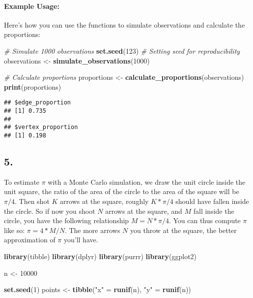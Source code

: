 \documentclass[
]{article}
\newenvironment{Shaded}{\begin{snugshade}}{\end{snugshade}}
\newcommand{\CommentTok}[1]{\textcolor[rgb]{0.56,0.35,0.01}{\textit{#1}}}
\newcommand{\DecValTok}[1]{\textcolor[rgb]{0.00,0.00,0.81}{#1}}
\newcommand{\FunctionTok}[1]{\textcolor[rgb]{0.13,0.29,0.53}{\textbf{#1}}}
\newcommand{\NormalTok}[1]{#1}
\newcommand{\OtherTok}[1]{\textcolor[rgb]{0.56,0.35,0.01}{#1}}
\newcommand{\StringTok}[1]{\textcolor[rgb]{0.31,0.60,0.02}{#1}}
\begin{document}
\paragraph{Example Usage:}\label{example-usage}

Here's how you can use the functions to simulate observations and
calculate the proportions:

\begin{Shaded}
\begin{Highlighting}[]
\CommentTok{\# Simulate 1000 observations}
\FunctionTok{set.seed}\NormalTok{(}\DecValTok{123}\NormalTok{)  }\CommentTok{\# Setting seed for reproducibility}
\NormalTok{observations }\OtherTok{\textless{}{-}} \FunctionTok{simulate\_observations}\NormalTok{(}\DecValTok{1000}\NormalTok{)}

\CommentTok{\# Calculate proportions}
\NormalTok{proportions }\OtherTok{\textless{}{-}} \FunctionTok{calculate\_proportions}\NormalTok{(observations)}
\FunctionTok{print}\NormalTok{(proportions)}
\end{Highlighting}
\end{Shaded}

\begin{verbatim}
## $edge_proportion
## [1] 0.735
## 
## $vertex_proportion
## [1] 0.198
\end{verbatim}

\subsection{5.}\label{section-4}

To estimate \(\pi\) with a Monte Carlo simulation, we draw the unit
circle inside the unit square, the ratio of the area of the circle to
the area of the square will be \(\pi / 4\). Then shot \(K\) arrows at
the square, roughly \(K * \pi / 4\) should have fallen inside the
circle. So if now you shoot \(N\) arrows at the square, and \(M\) fall
inside the circle, you have the following relationship
\(M = N * \pi / 4\). You can thus compute \(\pi\) like so:
\(\pi = 4 * M / N\). The more arrows \(N\) you throw at the square, the
better approximation of \(\pi\) you'll have.

\begin{Shaded}
\begin{Highlighting}[]
\FunctionTok{library}\NormalTok{(tibble)}
\FunctionTok{library}\NormalTok{(dplyr)}
\FunctionTok{library}\NormalTok{(purrr)}
\FunctionTok{library}\NormalTok{(ggplot2)}

\NormalTok{n }\OtherTok{\textless{}{-}} \DecValTok{10000}

\FunctionTok{set.seed}\NormalTok{(}\DecValTok{1}\NormalTok{)}
\NormalTok{points }\OtherTok{\textless{}{-}} \FunctionTok{tibble}\NormalTok{(}\StringTok{"x"} \OtherTok{=} \FunctionTok{runif}\NormalTok{(n), }\StringTok{"y"} \OtherTok{=} \FunctionTok{runif}\NormalTok{(n))}
\end{Highlighting}
\end{Shaded}
\end{document}
